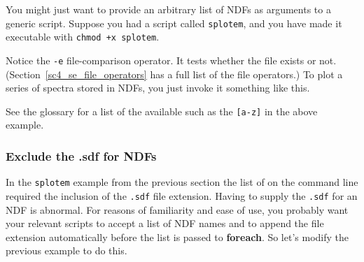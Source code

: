 \documentclass[twoside,11pt,nolof]{starlink}
\providecommand{\latexelsehtml}[2]{#1}
\providecommand{\NDFrefa}[1]{\xref{#1}{sun33}{}}
\begin{document}
You might just want to provide an arbitrary list of NDFs as arguments to
a generic script.  Suppose you had a script called \texttt{splotem}, and
you have made it executable with \mbox{\texttt{chmod +x splotem}}.

\begin{small}
\end{small}

Notice the \texttt{-e} file-comparison operator.  It tests whether the
file exists or not.  (\latexelsehtml{Section~\ref{sc4_se_file_operators}
has a}{Click \htmlref{here}{sc4_se_file_operators} for a} full list of
the file operators.) To plot a series of spectra stored in NDFs, you
just invoke it something like this.

\begin{small}
\begin{terminalv}
\end{terminalv}
\end{small}

See the glossary for a list of the available
 such as the \texttt{[a-z]} in the
above example.

\subsubsection{Exclude the .sdf for NDFs
\label{sc4_se_wildcard_nosdf}}

In the \latexelsehtml{\texttt{splotem} example from the previous
section}{\htmlref{splotem example}{sc4_se_wildcard_lists}} the list of
\NDFrefa{\textsf{NDF}s} on the command line required the inclusion of
the \texttt{.sdf} file extension.  Having to supply the \texttt{.sdf} for an
NDF is abnormal.  For reasons of familiarity and ease of use, you
probably want your relevant scripts to accept a list of NDF names and
to append the file extension automatically before the list is passed to
\textbf{foreach}.  \latexelsehtml{So let's modify the
previous example to do this.}{Here is an example.  It is a modified
version of the \texttt{splotem} script.}
\end{document}
